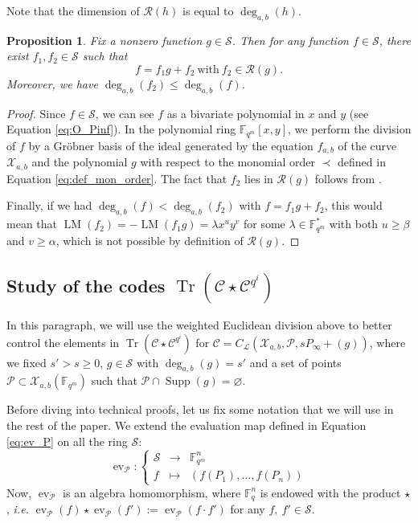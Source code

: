 \documentclass[peerreview]{IEEEtran}
\theoremstyle{plain}
\newtheorem{proposition}[thm]{Proposition}
\theoremstyle{definition}
\theoremstyle{remark}
\DeclareMathOperator{\ev}{ev}
\DeclareMathOperator{\trace}{Tr}
\newcommand{\calP}{\mathcal{P}}
\newcommand{\calL}{\mathcal{L}}
\newcommand{\calC}{\mathcal{C}}
\newcommand{\calR}{\mathcal{R}}
\newcommand{\calS}{\mathcal{S}}
\newcommand{\calX}{\mathcal{X}}
\newcommand{\fqm}{\mathbb{F}_{q^m}}
\newcommand{\fq}{\mathbb{F}_{q}}
\newcommand{\F}{\mathbb{F}}
\newcommand{\Tr}[1]{\trace\!\left(#1\right)}
\newcommand{\LM}[1]{\operatorname{LM}\left(#1\right)}
\newcommand{\Supp}{\operatorname{Supp}}
\newcommand{\degab}[1]{\deg_{a,b}\left(#1\right)}
\begin{document}
	Note that the dimension of $\calR(h)$ is equal to $\degab{h}$.
	
	\begin{proposition}\label{prop:div_grob}
		Fix a nonzero function $g \in \calS$. Then for any function $f \in \calS$, there exist $f_1,f_2 \in \calS$ such that
		\[ f=f_1g+f_2 \ \text{with} \ f_2 \in \calR(g).\]
		Moreover, we have $\degab{f_2} \leq \degab{f}$.
	\end{proposition}
	
	\begin{proof}
		Since $f \in \calS$, we can see $f$ as a bivariate polynomial in $x$ and $y$ (see Equation \ref{eq:O_Pinf}). In the polynomial ring $\F_{q^m}[x,y]$, we perform the division of $f$ by a Gr\"obner basis of the ideal generated by the equation $f_{a,b}$ of the curve $\calX_{a,b}$ and the polynomial $g$ with respect to the monomial order $\prec$ defined in Equation \eqref{eq:def_mon_order}. The fact that $f_2$ lies in $\calR(g)$ follows from \cite[Proposition 4]{GH00}.
		
		Finally, if we had $\degab{f} < \degab{f_2}$ with $f=f_1 g +f_2$, this would mean that $\LM{f_2}=-\LM{f_1 g}=\lambda x^uy^v$ for some $\lambda \in \F_{q^m}^*$ with both $u \geq \beta$ and $v \geq \alpha$, which is not possible by definition of $\calR\left(g\right)$.
	\end{proof}
	
	\subsection{Study of the codes $\Tr{\calC \star \calC^{q^i}}$} \label{subsection:study_Tr(C*C_q)}
	\noindent
	In this paragraph, we will use the weighted  Euclidean division above to better control the elements in $\Tr{\calC \star \calC^{q^i}}$ for $\calC = C_{\calL}(\calX_{a,b},\calP,sP_\infty+(g))$, where we fixed $s'>s \geq 0$, $g \in \calS$ with $\degab{g}= s'$ and a set of points  $\calP \subset \calX_{a,b}(\F_{q^m})$ such that $\calP \cap \Supp(g) = \varnothing$.
	
	Before diving into technical proofs, let us fix some notation that we will use in the rest of the paper. We extend the evaluation map defined in Equation \eqref{eq:ev_P} on all the ring $\calS$:
	\[	\ev_{\calP} : \left\{\begin{array}{rcl}
		\calS 	& \rightarrow & \fqm^n \\
		f 			& \mapsto	  &  (f(P_1),\dots,f(P_n)) 
	\end{array} \right.
	\]
	Now, $\ev_{\calP}$ is an algebra homomorphism, where $\fq^n$ is endowed with the product $\star$, \textit{i.e.} $\ev_{\calP}(f)\star\ev_{\calP}(f'):=\ev_{\calP}(f\cdot f')$ for any $f, \: f' \in  \calS$. 
	
\end{document}
